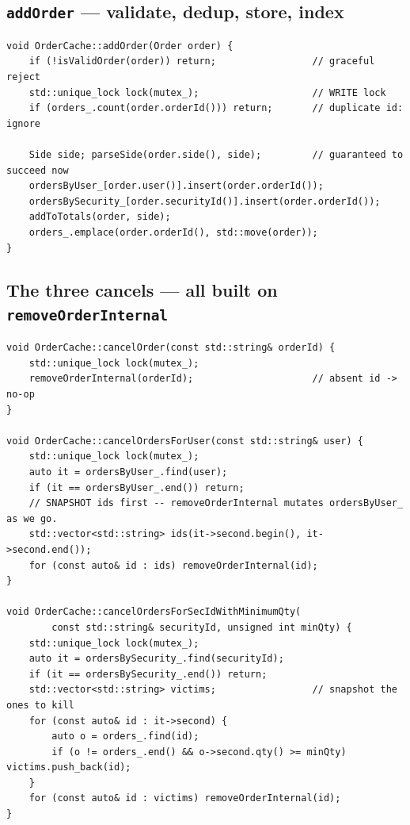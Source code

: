 \subsection{\texttt{addOrder} --- validate, dedup, store, index}

\begin{lstlisting}
void OrderCache::addOrder(Order order) {
    if (!isValidOrder(order)) return;                 // graceful reject
    std::unique_lock lock(mutex_);                    // WRITE lock
    if (orders_.count(order.orderId())) return;       // duplicate id: ignore

    Side side; parseSide(order.side(), side);         // guaranteed to succeed now
    ordersByUser_[order.user()].insert(order.orderId());
    ordersBySecurity_[order.securityId()].insert(order.orderId());
    addToTotals(order, side);
    orders_.emplace(order.orderId(), std::move(order));
}
\end{lstlisting}

\subsection{The three cancels --- all built on \texttt{removeOrderInternal}}

\begin{lstlisting}
void OrderCache::cancelOrder(const std::string& orderId) {
    std::unique_lock lock(mutex_);
    removeOrderInternal(orderId);                     // absent id -> no-op
}

void OrderCache::cancelOrdersForUser(const std::string& user) {
    std::unique_lock lock(mutex_);
    auto it = ordersByUser_.find(user);
    if (it == ordersByUser_.end()) return;
    // SNAPSHOT ids first -- removeOrderInternal mutates ordersByUser_ as we go.
    std::vector<std::string> ids(it->second.begin(), it->second.end());
    for (const auto& id : ids) removeOrderInternal(id);
}

void OrderCache::cancelOrdersForSecIdWithMinimumQty(
        const std::string& securityId, unsigned int minQty) {
    std::unique_lock lock(mutex_);
    auto it = ordersBySecurity_.find(securityId);
    if (it == ordersBySecurity_.end()) return;
    std::vector<std::string> victims;                 // snapshot the ones to kill
    for (const auto& id : it->second) {
        auto o = orders_.find(id);
        if (o != orders_.end() && o->second.qty() >= minQty) victims.push_back(id);
    }
    for (const auto& id : victims) removeOrderInternal(id);
}
\end{lstlisting}

